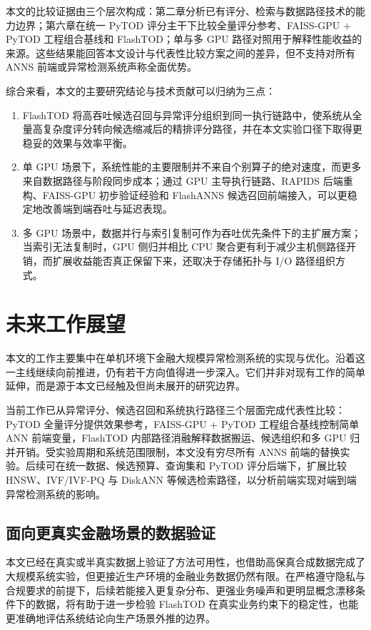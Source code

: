 本文的比较证据由三个层次构成：第二章分析已有评分、检索与数据路径技术的能力边界；第六章在统一 PyTOD 评分主干下比较全量评分参考、FAISS-GPU + PyTOD 工程组合基线和 FlashTOD；单与多 GPU 路径对照用于解释性能收益的来源。这些结果能回答本文设计与代表性比较方案之间的差异，但不支持对所有 ANNS 前端或异常检测系统声称全面优势。

综合来看，本文的主要研究结论与技术贡献可以归纳为三点：
\begin{enumerate}
  \item FlashTOD 将高吞吐候选召回与异常评分组织到同一执行链路中，使系统从全量高复杂度评分转向候选缩减后的精排评分路径，并在本文实验口径下取得更稳妥的效果与效率平衡。
  \item 单 GPU 场景下，系统性能的主要限制并不来自个别算子的绝对速度，而更多来自数据路径与阶段同步成本；通过 GPU 主导执行链路、RAPIDS 后端重构、FAISS-GPU 初步验证经验和 FlashANNS 候选召回前端接入，可以更稳定地改善端到端吞吐与延迟表现。
  \item 多 GPU 场景中，数据并行与索引复制可作为吞吐优先条件下的主扩展方案；当索引无法复制时，GPU 侧归并相比 CPU 聚合更有利于减少主机侧路径开销，而扩展收益能否真正保留下来，还取决于存储拓扑与 I/O 路径组织方式。
\end{enumerate}

\section{未来工作展望}

本文的工作主要集中在单机环境下金融大规模异常检测系统的实现与优化。沿着这一主线继续向前推进，仍有若干方向值得进一步深入。它们并非对现有工作的简单延伸，而是源于本文已经触及但尚未展开的研究边界。

当前工作已从异常评分、候选召回和系统执行路径三个层面完成代表性比较：PyTOD 全量评分提供效果参考，FAISS-GPU + PyTOD 工程组合基线控制简单 ANN 前端变量，FlashTOD 内部路径消融解释数据搬运、候选组织和多 GPU 归并开销。受实验周期和系统范围限制，本文没有穷尽所有 ANNS 前端的替换实验。后续可在统一数据、候选预算、查询集和 PyTOD 评分后端下，扩展比较 HNSW、IVF/IVF-PQ 与 DiskANN 等候选检索路径，以分析前端实现对端到端异常检测系统的影响。

\subsection{面向更真实金融场景的数据验证}

本文已经在真实或半真实数据上验证了方法可用性，也借助高保真合成数据完成了大规模系统实验，但更接近生产环境的金融业务数据仍然有限。在严格遵守隐私与合规要求的前提下，后续若能接入更复杂分布、更强业务噪声和更明显概念漂移条件下的数据，将有助于进一步检验 FlashTOD 在真实业务约束下的稳定性，也能更准确地评估系统结论向生产场景外推的边界。


